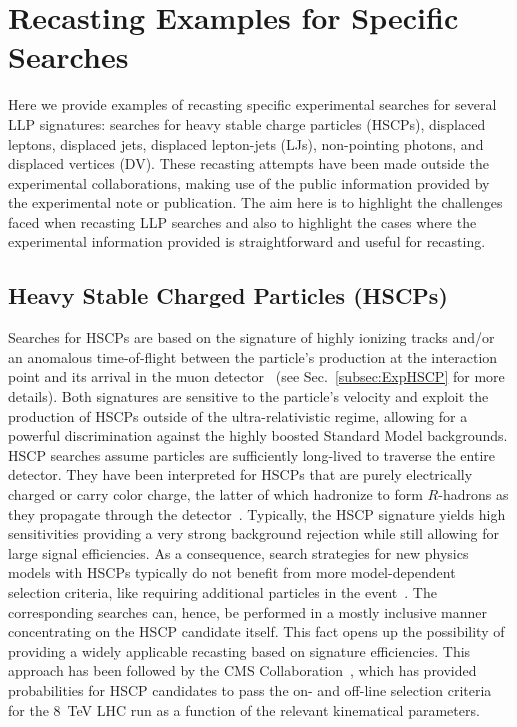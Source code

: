 \section{Recasting Examples for Specific Searches}
\label{sec:ch5-recastExamples}

Here we provide examples of recasting specific experimental
searches for several LLP signatures: searches for heavy stable charge particles (HSCPs), displaced
leptons, displaced jets, displaced lepton-jets (LJs), non-pointing photons, and displaced vertices (DV).
These recasting attempts have been made outside the experimental collaborations,
making use of the public information provided by the experimental note or
publication. The aim here is to highlight the challenges faced when recasting
LLP searches and also to highlight the cases where the
experimental information provided is straightforward and useful for
recasting.

\subsection{Heavy Stable Charged Particles (HSCPs)}
\label{sec:ch5-HSCPs}

\renewcommand{\vec}[1]{\boldsymbol{#1}}
%

Searches for HSCPs are based on the signature
of highly ionizing tracks and/or an anomalous time-of-flight between 
the particle's production at the interaction point and its arrival in the
muon detector~\cite{Fairbairn:2006gg} (see Sec.~\ref{subsec:ExpHSCP} for more details).
Both signatures are sensitive to the particle's velocity and exploit the
production of HSCPs outside of the ultra-relativistic regime,
allowing for a powerful discrimination against the highly boosted Standard Model backgrounds.
HSCP searches assume particles are sufficiently long-lived to traverse
the entire detector.
They have been interpreted for HSCPs that are 
purely electrically charged or carry color charge, the latter of which hadronize to form
$R$-hadrons as they propagate through the detector~\cite{Farrar:1978xj}.
Typically, the HSCP signature yields high sensitivities providing
a very strong background rejection while still allowing for large
signal efficiencies.
As a consequence, search strategies for new physics models with HSCPs
typically do not benefit from more model-dependent selection criteria, like requiring additional
particles in the event~\cite{Heisig:2012zq}. The corresponding searches can, hence, be
performed in a mostly inclusive manner concentrating on the HSCP candidate itself.
This fact opens up the possibility of providing a widely applicable recasting based on signature
efficiencies. This approach has been followed by the CMS
Collaboration~\cite{Khachatryan:2015lla},
which has provided probabilities for HSCP candidates to pass the on- and
off-line selection criteria for the 8~TeV LHC run as a function of the relevant kinematical parameters.

